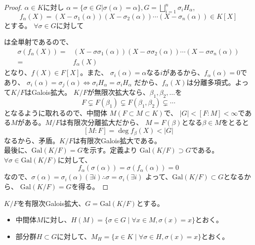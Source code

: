 \documentclass[dvipdfmx]{jsarticle}
\theoremstyle{definition}
\begin{document}
\begin{proof}
  $\alpha\in K$に対し
  $\alpha =\{\sigma\in G|\sigma (\alpha)=\alpha\},
  G=\bigsqcup_{i=1}^{n} {\sigma_i H_\alpha}$,
  \[f_\alpha(X)=(X-\sigma _1(\alpha))(X-\sigma _2(\alpha))\cdots
  (X-\sigma _n(\alpha))\in K[X]\]
  とする。
  $\forall\sigma\in G$に対して
\begin{center}
\end{center}
    は全単射であるので、
  \begin{align*}
    \sigma(f_\alpha(X))=&(X-\sigma\sigma _1(\alpha))(X-\sigma\sigma _2(\alpha))\cdots
    (X-\sigma\sigma _n(\alpha))\\
                =&f_\alpha(X)
  \end{align*}
  となり、$f(X)\in F[X]$。また、
  $\sigma _i(\alpha)=\alpha$なる$i$があるから、$f_\alpha(\alpha)=0$であり、
  $\sigma _i(\alpha)=\sigma _j(\alpha)\Longleftrightarrow 
  \sigma _i H_\alpha =\sigma _i H_\alpha$
  だから、$f_\alpha(X)$は分離多項式。よって$K/F$はGalois拡大。
  $K/F$が無限次拡大なら、$\beta _1,\beta _2,\ldots$を
  \[F\subsetneq F(\beta _1)\subsetneq  F(\beta _1,\beta _2)\subsetneq\cdots\]
  となるように取れるので、中間体
  $M(F\subset M\subset K)$で、
  $|G|<[F:M]<\infty$である$M$がある。$M/F$は有限次分離拡大だから、
  $M=F(\beta)$となる$\beta\in M$をとると
  \[[M:F]=\deg f_\beta(X)<|G|\]
  なるから、矛盾。$K/F$は有限次Galois拡大である。\\
  最後に、$\mathrm{Gal}(K/F)=G$を示す。定義より
  $\mathrm{Gal}(K/F)\supset G$である。
  $\forall \sigma\in \mathrm{Gal}(K/F)$に対して、
  \[f_\alpha (\sigma(\alpha))=\sigma (f_\alpha (\alpha))=0\]
  なので、$\sigma (\alpha)=\sigma _i(\alpha)(\exists i)
  \therefore \sigma =\sigma _i(\exists i)$
  よって、$\mathrm{Gal}(K/F)\subset G$となるから、
  $\mathrm{Gal}(K/F)=G$を得る。
\end{proof}
$K/F$を有限次Galois拡大、$G=\mathrm{Gal}(K/F)$とする。
\begin{itemize}
  \item 中間体$M$に対し、$H(M)=\{\sigma\in G\mid \forall x\in M,\sigma(x)=x\}$とおく。
  \item 部分群$H\subset G$に対して、$M_ H=\{x\in K\mid \forall\sigma\in H,\sigma(x)=x\}$とおく。
\end{itemize}
\end{document}
